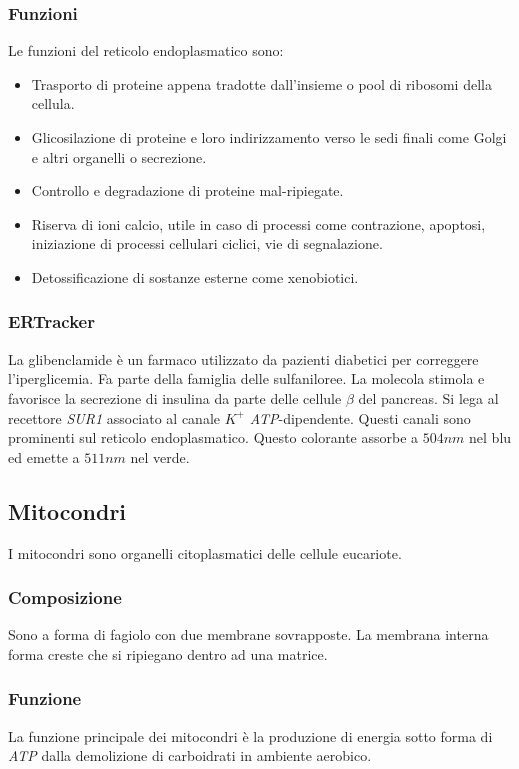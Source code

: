 		\subsubsection{Funzioni}
		Le funzioni del reticolo endoplasmatico sono:
		\begin{multicols}{2}
			\begin{itemize}
				\item Trasporto di proteine appena tradotte dall'insieme o pool di ribosomi della cellula.
				\item Glicosilazione di proteine e loro indirizzamento verso le sedi finali come Golgi e altri organelli o secrezione.
				\item Controllo e degradazione di proteine mal-ripiegate.
				\item Riserva di ioni calcio, utile in caso di processi come contrazione, apoptosi, iniziazione di processi cellulari ciclici, vie di segnalazione.
				\item Detossificazione di sostanze esterne come xenobiotici.
			\end{itemize}
		\end{multicols}

		\subsubsection{ERTracker}
		La glibenclamide \`e un farmaco utilizzato da pazienti diabetici per correggere l'iperglicemia.
		Fa parte della famiglia delle sulfaniloree.
		La molecola stimola e favorisce la secrezione di insulina da parte delle cellule $\beta$ del pancreas.
		Si lega al recettore \emph{SUR1} associato al canale $K^+$ \emph{ATP}-dipendente.
		Questi canali sono prominenti sul reticolo endoplasmatico.
		Questo colorante assorbe a $504\si{nm}$ nel blu ed emette a $511\si{nm}$ nel verde.

	\subsection{Mitocondri}
	I mitocondri sono organelli citoplasmatici delle cellule eucariote.

		\subsubsection{Composizione}
		Sono a forma di fagiolo con due membrane sovrapposte.
		La membrana interna forma creste che si ripiegano dentro ad una matrice.

		\subsubsection{Funzione}
		La funzione principale dei mitocondri \`e la produzione di energia sotto forma di \emph{ATP} dalla demolizione di carboidrati in ambiente aerobico.

